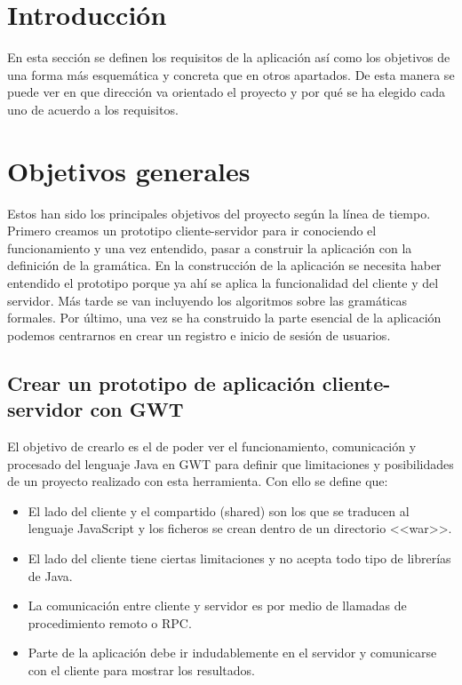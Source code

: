 
\section{Introducción}

En esta sección se definen los requisitos de la aplicación así como los objetivos de una forma más esquemática y concreta que en otros apartados. De esta manera se puede ver en que dirección va orientado el proyecto y por qué se ha elegido cada uno de acuerdo a los requisitos.

\section{Objetivos generales}

Estos han sido los principales objetivos del proyecto según la línea de tiempo. Primero creamos un prototipo cliente-servidor para ir conociendo el funcionamiento y una vez entendido, pasar a construir la aplicación con la definición de la gramática. En la construcción de la aplicación se necesita haber entendido el prototipo porque ya ahí se aplica la funcionalidad del cliente y del servidor. Más tarde se van incluyendo los algoritmos sobre las gramáticas formales. Por último, una vez se ha construido la parte esencial de la aplicación podemos centrarnos en crear un registro e inicio de sesión de usuarios.

\subsection{Crear un prototipo de aplicación cliente-servidor con GWT}

El objetivo de crearlo es el de poder ver el funcionamiento, comunicación y procesado del lenguaje Java en GWT para definir que limitaciones y posibilidades de un proyecto realizado con esta herramienta. Con ello se define que:  
\begin{itemize}
\item El lado del cliente y el compartido (shared) son los que se traducen al lenguaje JavaScript y los ficheros se crean dentro de un directorio <<war>>.
\item El lado del cliente tiene ciertas limitaciones y no acepta todo tipo de librerías de Java. 
\item La comunicación entre cliente y servidor es por medio de llamadas de procedimiento remoto o RPC.
\item Parte de la aplicación debe ir indudablemente en el servidor y comunicarse con el cliente para mostrar los resultados.
\end{itemize}

